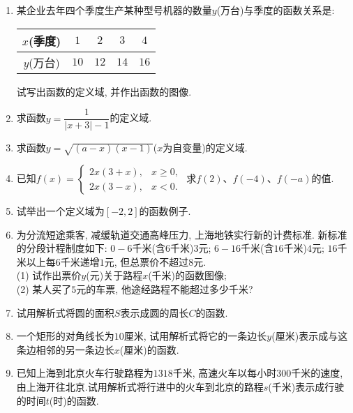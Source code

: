 \documentclass[10pt,a4paper]{article}
\begin{document}
\begin{enumerate}[1.]
\begin{center}
\end{center}
\item 某企业去年四个季度生产某种型号机器的数量$y$(万台)与季度的函数关系是:
\begin{center}
    \begin{tabular}{|c|c|c|c|c|}
        \hline
        $x$(季度) & $1$ & $2$ & $3$ & $4$\\ \hline
        $y$(万台) & $10$ & $12$ & $14$ & $16$\\ \hline
    \end{tabular}
\end{center}
试写出函数的定义域, 并作出函数的图像.
\item 求函数$y=\dfrac 1{|x+3|-1}$的定义域.
\item 求函数$y=\sqrt {(a-x)(x-1)}$($x$为自变量)的定义域.
\item 已知$f(x)=\begin{cases} 2x(3+x), & x\ge 0, \\ 2x(3-x), & x<0. \end{cases}$ 求$f(2)$、$f(-4)$、$f(-a)$的值.
\item 试举出一个定义域为$[-2,2]$的函数例子.
\item 为分流短途乘客, 减缓轨道交通高峰压力, 上海地铁实行新的计费标准. 新标准的分段计程制度如下: $0-6$千米(含$6$千米)$3$元; $6-16$千米(含$16$千米)$4$元; $16$千米以上每$6$千米递增$1$元, 但总票价不超过$8$元.\\
(1) 试作出票价$y$(元)关于路程$x$(千米)的函数图像;\\
(2) 某人买了$5$元的车票, 他途经路程不能超过多少千米?
\item 试用解析式将圆的面积$S$表示成圆的周长$C$的函数.
\item 一个矩形的对角线长为$10$厘米, 试用解析式将它的一条边长$y$(厘米)表示成与这条边相邻的另一条边长$x$(厘米)的函数.
\item 已知上海到北京火车行驶路程为$1318$千米, 高速火车以每小时$300$千米的速度, 由上海开往北京.试用解析式将行进中的火车到北京的路程$s$(千米)表示成行驶的时间$t$(时)的函数.

\end{enumerate}
\end{document}

